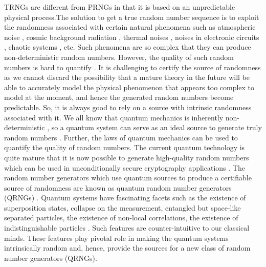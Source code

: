 \documentclass[]{interact}
\theoremstyle{plain}%
\theoremstyle{definition}
\theoremstyle{remark}
\begin{document}
TRNGs are different from PRNGs in that it is based on an unpredictable physical process.The solution to get a true random number sequence is to exploit the randomness associated with certain natural phenomena such as atmospheric noise \cite{haahr1999introduction}, cosmic background radiation \cite{lee2017cosmic}, thermal noises \cite{zhun2001truly}, noises in electronic circuits \cite{hamburg2012analysis}, chaotic systems \cite{stojanovski2001chaos}, etc.  Such phenomena are so complex that they can produce non-deterministic random numbers. However, the quality of such random numbers is hard to quantify \cite{killmann2011proposal}. It is challenging to certify the source of randomness as we cannot discard the possibility that a mature theory in the future will be able to accurately model the physical phenomenon that appears too complex to model at the moment, and hence the generated random numbers become predictable. So, it is always good to rely on a source with intrinsic randomness associated with it. We all know that quantum mechanics is inherently non-deterministic \cite{bera2017randomness,yuan2015}, so a quantum system can serve as an ideal source to generate truly random numbers \cite{ananthaswamy2019turn}. Further, the laws of quantum mechanics can be used to quantify the quality of random numbers. The current quantum technology is quite mature that it is now possible to generate high-quality random numbers which can be used in unconditionally secure cryptography applications \cite{jacak2021quantum}. The random number generators which use quantum sources to produce a certifiable source of randomness are known as quantum random number generators (QRNGs) \cite{herrero2017quantum,ma2016quantum}. Quantum systems have fascinating facets such as the existence of superposition states, collapse on the measurement, entangled but space-like separated particles, the existence of non-local correlations, the existence of indistinguishable particles \cite{nielsen,pathak2013elements}. Such features are counter-intuitive to our classical minds. These features play pivotal role in making the quantum systems intrinsically random and, hence, provide the sources for a new class of random number generators (QRNGs). 
\end{document}
